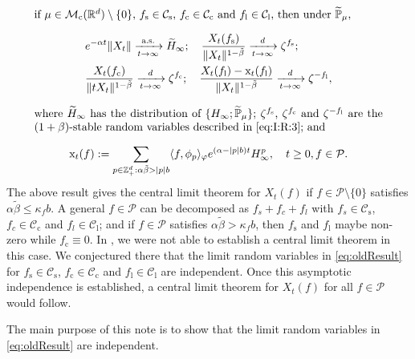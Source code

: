 \documentclass[12pt,a4paper]{amsart}
\theoremstyle{plain}
\theoremstyle{definition}
\numberwithin{equation}{section}
\begin{document}
	\begin{equation}\label{eq:oldResult}
\begin{minipage}{0.9\textwidth}
	if $\mu\in \mathcal M_\mathrm c(\mathbb R^d)\setminus \{0\}$, $f_\mathrm s\in \mathcal C_\mathrm s$, $f_\mathrm c \in \mathcal C_\mathrm c$ and $f_\mathrm l \in \mathcal C_\mathrm l$, then under $\mathbb {\widetilde P}_\mu$,
\[
\begin{split}
	&e^{-\alpha t}\|X_t\| \xrightarrow[t\to \infty]{\text{a.s.}} \widetilde{H}_\infty;
	\quad \frac{X_t(f_\mathrm s)}{\|X_t\|^{1-\tilde \beta}} \xrightarrow[t\to \infty]{d} \zeta^{f_\mathrm s};
	\\&\frac{X_t(f_\mathrm c)}{\|t X_t\|^{1-\tilde \beta} } \xrightarrow[t\to \infty]{d} \zeta^{f_\mathrm c};
	\quad\frac{X_t(f_\mathrm l) - \mathrm x_t(f_\mathrm l)}{\|X_t\|^{1-\tilde \beta}}
	\xrightarrow[t\to \infty]{d} \zeta^{-f_\mathrm l},
\end{split}
\]
	where $\widetilde H_\infty$ has the distribution of $\{H_{\infty}; \widetilde {\mathbb P}_\mu\}$;
	$\zeta^{f_\mathrm s}$, $\zeta^{f_\mathrm c}$ and $\zeta^{-f_\mathrm l}$ are the $(1+\beta)$-stable random variables described in \eqref{eq:I:R:3}; and
\[
	\mathrm x_t(f)
	:= \sum_{p\in \mathbb Z^d_+:\alpha \tilde \beta>|p|b}\langle f,\phi_p\rangle_\varphi e^{(\alpha-|p|b)t}H^p_{\infty},
	\quad t\geq 0, f\in \mathcal P.
\]
\end{minipage}
\end{equation}
	The above result gives the central limit theorem for $X_t(f)$ if $f\in \mathcal P\setminus\{0\}$ satisfies $\alpha \tilde \beta \leq \kappa_f b$.
	A general  $f \in \mathcal P$ can be decomposed as $f_s + f_c + f_l$ with $f_s \in \mathcal C_\mathrm s$, $f_c \in \mathcal C_\mathrm c$ and $f_l \in \mathcal C_\mathrm l$;
  and if $f\in  \mathcal P$ satisfies $\alpha \tilde \beta > \kappa_f b$, then $f_\mathrm s$ and $f_\mathrm l$ maybe non-zero while $f_\mathrm c \equiv 0$.
	In \cite{RenSongSunZhao2019Stable}, we were not able to establish a central limit theorem in this case. We conjectured there that the limit random variables in \eqref{eq:oldResult} for $f_\mathrm s\in \mathcal C_\mathrm s$, $f_\mathrm c\in \mathcal C_\mathrm c$ and $f_\mathrm l\in \mathcal C_\mathrm l$ are independent.
	Once this asymptotic independence is established, a central limit theorem  for $ X_t(f)$ for all $f\in  \mathcal P$ would follow.

	The main purpose of this note is to show that the limit  random variables in \eqref{eq:oldResult} are independent.
\end{document}
